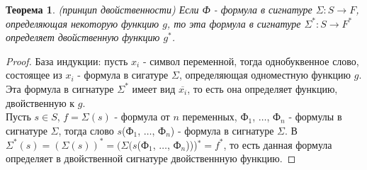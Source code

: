 \documentclass[a4paper, 12pt]{article}
\theoremstyle{definition}
\theoremstyle{plain}
\newtheorem*{theorem}{Теорема}
\theoremstyle{remark}
\begin{document}
  \begin{theorem}(принцип двойственности)
    Если Ф - формула в сигнатуре $\Sigma: S\to F$, определяющая некоторую функцию $g$, то эта формула в сигнатуре $\Sigma^*: S\to F^*$ определяет двойственную функцию $g^*$.
  \end{theorem}
  \begin{proof}
    База индукции: пусть $x_i$ - символ переменной, тогда однобуквенное слово, состоящее из $x_i$ - формула в сигатуре $\Sigma$, определяющая одноместную функцию $g$. Эта формула в сигнатуре $\Sigma^*$ имеет вид $\overline{x_i}$, то есть она определяет функцию, двойственную к $g$.\\
    Пусть $s\in S$, $f=\Sigma(s)$ - формула от $n$ переменных, Ф$_1$, $\ldots$, Ф$_n$ - формулы в сигнатуре $\Sigma$, тогда слово $s$(Ф$_1$, $\ldots$, Ф$_n$) - формула в сигнатуре $\Sigma$. В $\Sigma^*(s)=(\Sigma(s))^*=(\Sigma(s$(Ф$_1$, $\ldots$, Ф$_n$)))$^*=f^*$, то есть данная формула определяет в двойственной сигнатуре двойственнную функцию.
  \end{proof}
\end{document}
